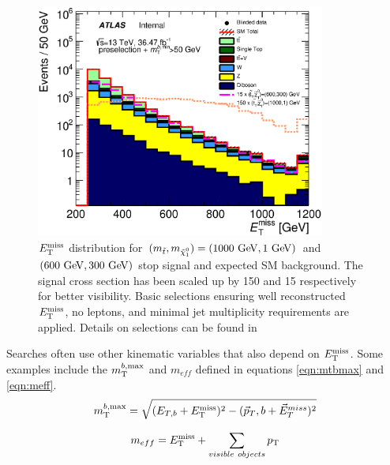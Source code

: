 \begin{figure}[h!]
\centering
    \includegraphics[width=0.85\textwidth]{figures/preselection/Met_preCutSRPlot_withRatio_log.eps}\hspace{0.05\textwidth}
\caption[Stop signal with $m_{\stop}-m_{\ninoone} >> m_t$ and SM background $\met$ distribution after loose preliminary selections for $\met>250 \gev$, zero leptons and at least four jets]{ $\met$ distribution for $(m_{\stop}, m_{\ninoone}) = (1000 \gev,1 \gev)$ and $(600 \gev, 300 \gev)$ stop signal and expected SM background.  The signal cross section has been scaled up by 150 and 15 respectively for better visibility.  Basic selections ensuring well reconstructed $\met$, no leptons, and minimal jet multiplicity requirements are applied.  Details on selections can be found in \cite{stop0LCONF} }
\label{fig:presel:MET1}
\end{figure}

\indent Searches often use other kinematic variables that also depend on $\met$.  Some examples include the $m_{\mathrm{T}}^{b,\mathrm{max}}$ and $m_{eff}$ defined in equations \ref{eqn:mtbmax} and \ref{eqn:meff}. \\

\begin{equation}
m_{\mathrm{T}}^{b,\mathrm{max}} = \sqrt{  (E_{T,b} +E_{\mathrm{T}}^{\mathrm{miss}} )^2 - ( \vec{p}_T,b + \vec{E}_{T}^{miss} )^2 }
\label{eqn:mtbmax}
\end{equation}

\begin{equation}
m_{eff} =  E_{\mathrm{T}}^{\mathrm{miss}} + \sum_{visible~objects} p_{\mathrm{T}} 
\label{eqn:meff}
\end{equation}

